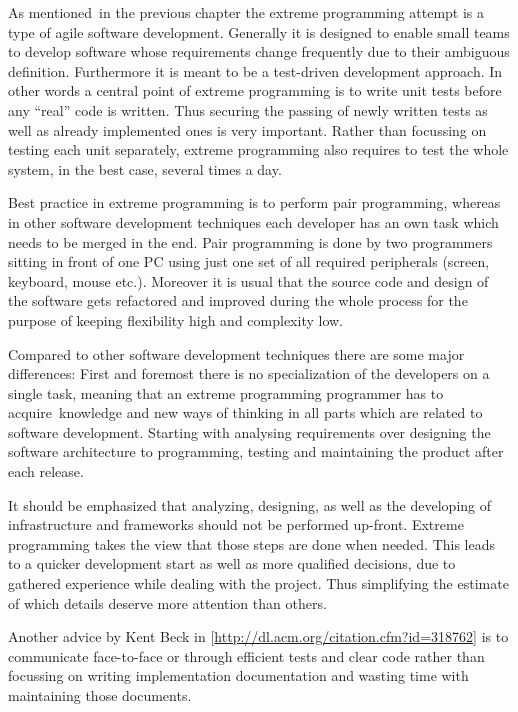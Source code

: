 {As mentioned}{~in the previous chapter the extreme programming attempt
is a type of agile software development. Generally it is desig}{ned to
enable small teams to develop software whose requirements change
frequently due to their ambiguous definition. Furthermore it is meant to
be a test-driven development approach. In other words a central point of
extreme programming is to write unit tests before any ``real'' code is
written. Thus securing the passing of newly written tests as well as
already implemented ones is very important. Rather than focussing on
testing each unit separately, extreme programming also requires to test
the whole system, in the best case, several times a day.}

{Best practice in extreme programming is to perform pair programming,
whereas in other software development techniques each developer has an
own task which needs to be merged in the end. Pair programming is done
by two programmers sitting in front of one PC using just one set of all
required peripherals (screen, keyboard, mouse etc.). Moreover it is
usual that the source code and design of the software gets refactored
and improved during the whole process for the purpose of keeping
flexibility high and complexity low.}

{Compared to other software development techniques there are some major
differences: First and foremost there is no specialization of the
developers on a single task, meaning that an extreme programming
programmer has to acquire}{~}{knowledge and new ways of thinking in all
parts which are related to software development. Starting with analysing
requirements over designing the software architecture to programming,
testing and maintaining the product after each release.}

{It should be emphasized that analyzing, designing, as well as the
developing of infrastructure and frameworks should }{not }{be performed
}{up-front}{. Extreme programming takes the view that those steps are
done when needed. This leads to a quicker development start as well as
more qualified decisions, due to gathered experience while dealing with
the project. Thus simplifying the estimate of which details deserve more
attention than others.}

{Another advice by Kent Beck in
{[}}{\href{https://www.google.com/url?q=http://dl.acm.org/citation.cfm?id\%3D318762\&sa=D\&ust=1460827923722000\&usg=AFQjCNHr2LQlB2UPss1lgCYPUbVINIAJOw}{http://dl.acm.org/citation.cfm?id=318762}}{{]}
}{is to communicate face-to-face or through efficient tests and clear
code rather than focussing on writing implementation documentation and
wasting time with maintaining those documents.}

